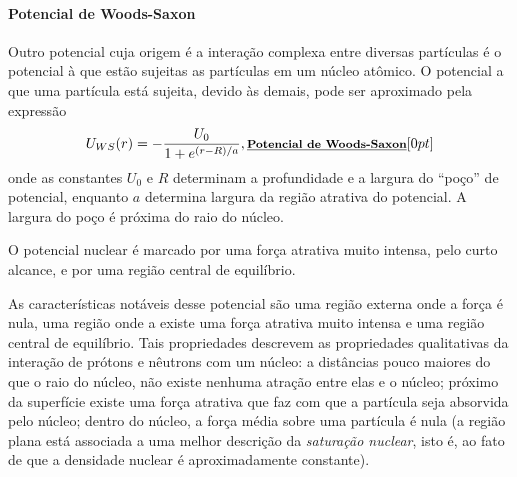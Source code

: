 \paragraph{Potencial de Woods-Saxon}

Outro potencial cuja origem é a interação complexa entre diversas partículas é o potencial à que estão sujeitas as partículas em um núcleo atômico. O potencial a que uma partícula está sujeita, devido às demais, pode ser aproximado pela expressão
\begin{equation}
    U_{WS}(r) = - \frac{U_0}{1 + e^{(r - R) / a}}, \relax{\footnotesize\emph{\textbf{Potencial de Woods-Saxon}}}[0pt]
\end{equation}
%
onde as constantes $U_0$ e $R$ determinam a profundidade e a largura do ``poço'' de potencial, enquanto $a$ determina largura da região atrativa do potencial. A largura do poço é próxima do raio do núcleo.

\begin{marginfigure}[2cm]
\centering
{}
\caption{O potencial nuclear é marcado por uma força atrativa muito intensa, pelo curto alcance, e por uma região central de equilíbrio.}
\end{marginfigure}

As características notáveis desse potencial são uma região externa onde a força é nula, uma região onde a existe uma força atrativa muito intensa e uma região central de equilíbrio. Tais propriedades descrevem as propriedades qualitativas da interação de prótons e nêutrons com um núcleo: a distâncias pouco maiores do que o raio do núcleo, não existe nenhuma atração entre elas e o núcleo; próximo da superfície existe uma força atrativa que faz com que a partícula seja absorvida pelo núcleo; dentro do núcleo, a força média sobre uma partícula é nula (a região plana está associada\cite{Matta2017} a uma melhor descrição da \emph{saturação nuclear}, isto é, ao fato de que a densidade nuclear é aproximadamente constante).

